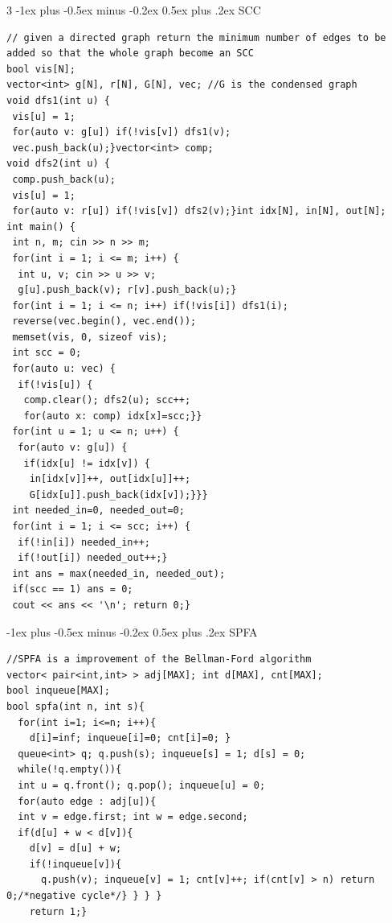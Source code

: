 \documentclass[8pt,a4paper,onesided]{article}
\makeatletter
\renewcommand{\subsection}{\@startsection{subsection}{2}{0mm}
    {-1ex plus -0.5ex minus -0.2ex} %
    {0.5ex plus .2ex}                %
    {\normalfont\large\bfseries}}    %
\makeatother
\begin{document}
\begin{multicols}{3}
\subsection{SCC}
\begin{verbatim}
// given a directed graph return the minimum number of edges to be added so that the whole graph become an SCC
bool vis[N];
vector<int> g[N], r[N], G[N], vec; //G is the condensed graph
void dfs1(int u) {
 vis[u] = 1;
 for(auto v: g[u]) if(!vis[v]) dfs1(v);
 vec.push_back(u);}vector<int> comp;
void dfs2(int u) {
 comp.push_back(u);
 vis[u] = 1;
 for(auto v: r[u]) if(!vis[v]) dfs2(v);}int idx[N], in[N], out[N];
int main() {
 int n, m; cin >> n >> m;
 for(int i = 1; i <= m; i++) {
  int u, v; cin >> u >> v;
  g[u].push_back(v); r[v].push_back(u);}
 for(int i = 1; i <= n; i++) if(!vis[i]) dfs1(i);
 reverse(vec.begin(), vec.end());
 memset(vis, 0, sizeof vis);
 int scc = 0;
 for(auto u: vec) {
  if(!vis[u]) {
   comp.clear(); dfs2(u); scc++;
   for(auto x: comp) idx[x]=scc;}}
 for(int u = 1; u <= n; u++) {
  for(auto v: g[u]) {
   if(idx[u] != idx[v]) {
    in[idx[v]]++, out[idx[u]]++;
    G[idx[u]].push_back(idx[v]);}}}
 int needed_in=0, needed_out=0;
 for(int i = 1; i <= scc; i++) {
  if(!in[i]) needed_in++;
  if(!out[i]) needed_out++;}
 int ans = max(needed_in, needed_out);
 if(scc == 1) ans = 0;
 cout << ans << '\n'; return 0;}
\end{verbatim}
\subsection{SPFA}
\begin{verbatim}
//SPFA is a improvement of the Bellman-Ford algorithm
vector< pair<int,int> > adj[MAX]; int d[MAX], cnt[MAX];
bool inqueue[MAX];
bool spfa(int n, int s){
  for(int i=1; i<=n; i++){
    d[i]=inf; inqueue[i]=0; cnt[i]=0; }
  queue<int> q; q.push(s); inqueue[s] = 1; d[s] = 0;
  while(!q.empty()){
  int u = q.front(); q.pop(); inqueue[u] = 0;
  for(auto edge : adj[u]){
  int v = edge.first; int w = edge.second;
  if(d[u] + w < d[v]){
    d[v] = d[u] + w;
    if(!inqueue[v]){
      q.push(v); inqueue[v] = 1; cnt[v]++; if(cnt[v] > n) return 0;/*negative cycle*/} } } }
    return 1;}
\end{verbatim}

\end{multicols}
\end{document}
